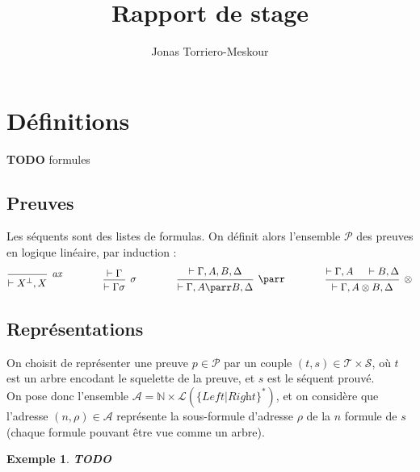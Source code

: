 \documentclass[11pt,a4paper]{article}
\title{Rapport de stage}
\author{Jonas Torriero-Meskour}
\newtheorem{example}{Exemple}
\newcommand*{\orth}{^\perp}
\newcommand*{\tensor}{\otimes}
\newcommand*{\hypv}[1]{\hypo{\vdash #1}}
\newcommand*{\axv}[1]{\infer{0}[\ensuremath{\mathit{ax}}]{\vdash #1}}
\newcommand*{\tensorv}[1]{\infer{2}[\ensuremath{\tensor}]{\vdash #1}}
\newcommand*{\parrv}[1]{\infer{1}[\ensuremath{\parr}]{\vdash #1}}
\newcommand*{\permv}[1]{\infer{1}[\ensuremath{\sigma}]{\vdash #1}}
\newcommand*{\Left}{\textit{Left}}
\newcommand*{\Right}{\textit{Right}}
\newcommand*{\trees}{\ensuremath{\mathcal{T}}}
\newcommand*{\todo}{{\normalfont \textbf{TODO}} }
\begin{document}
\maketitle

\section{Définitions}

\todo formules

\subsection{Preuves}
Les séquents sont des listes de formulas. On définit alors l'ensemble $\mathcal{P}$ des preuves en logique linéaire, par induction :
\begin{equation*}
\begin{prooftree}
  \axv{X\orth, X}
\end{prooftree}
\qquad\qquad
\begin{prooftree}
  \hypv{\Gamma}
  \permv{\Gamma{\sigma}}
\end{prooftree}
\qquad\qquad
\begin{prooftree}
  \hypv{\Gamma, A, B, \Delta}
  \parrv{\Gamma, A \parr B, \Delta}
\end{prooftree}
\qquad\qquad
\begin{prooftree}
  \hypv{\Gamma, A}
  \hypv{B, \Delta}
  \tensorv{\Gamma, A \tensor B, \Delta}
\end{prooftree}
\end{equation*}

\subsection{Représentations}
On choisit de représenter une preuve $p \in \mathcal{P}$ par un couple $(t, s) \in \trees \times \mathcal{S}$, où $t$ est un arbre encodant le squelette de la preuve, et $s$ est le séquent prouvé.
\\

On pose donc l'ensemble $\mathcal{A} = \mathbb{N} \times \mathcal{L} ( \{ \Left | \Right\}^{*} )$, et on considère que l'adresse $(n, \rho) \in \mathcal{A}$ représente la sous-formule d'adresse $\rho$ de la $n$\ieme{} formule de $s$ (chaque formule pouvant être vue comme un arbre).
\\


\begin{example}
  \todo
\end{example}
\end{document}
